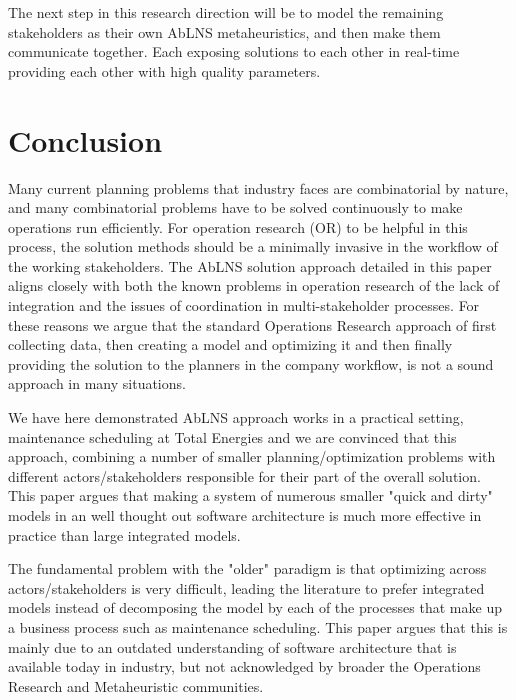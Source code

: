The next step in this research direction will be to model the remaining stakeholders as their own 
AbLNS metaheuristics, and then make them communicate together. Each exposing solutions to each 
other in real-time providing each other with high quality parameters.

\section{Conclusion}
Many current planning problems that industry faces are combinatorial by nature, 
and many combinatorial problems have to be solved continuously to make operations 
run efficiently. For operation research (OR) to be helpful in this process, the solution methods 
should be a minimally invasive in the workflow of the working stakeholders. 
The AbLNS solution approach detailed in this paper aligns
closely with both the known problems in operation research of the lack of integration and the issues of 
coordination in multi-stakeholder processes. For these reasons we argue that the
standard Operations Research approach of  first collecting data, then creating a
model and optimizing it and then finally providing the solution to the planners
in the company workflow, is not a sound approach in many situations.

We have here demonstrated AbLNS approach works in a practical setting,
maintenance scheduling at  Total Energies and we are convinced that this
approach, combining a number of smaller planning/optimization problems with
different actors/stakeholders responsible for their part of the overall
solution. This paper argues that making a system of numerous smaller  "quick
and dirty" models in an well thought out software architecture is much more
effective in practice than large integrated models.

The fundamental problem with the "older" paradigm is that optimizing across
actors/stakeholders is very difficult, leading the literature to prefer
integrated models instead of decomposing the model by each of the
processes that make up a business process such as maintenance scheduling.
This paper argues that this is mainly due to an outdated understanding of
software architecture that is available today in industry, but not acknowledged by broader the Operations Research
and Metaheuristic communities.
